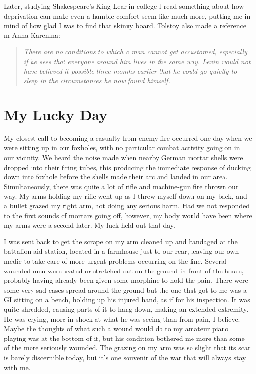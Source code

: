 \documentclass[../m3y]{subfiles}
\begin{document}
Later, studying Shakespeare's King Lear in college I read something about how deprivation can make even a humble comfort seem like much more, putting me in mind of how glad I was to find that skinny board. Tolstoy also made a reference in Anna Karenina:

\begin{quote}
    \emph{There are no conditions to which a man cannot get accustomed, especially if he sees that everyone around him lives in the same way. Levin would not have believed it possible three months earlier that he could go quietly to sleep in the circumstances he now found himself.}
\end{quote}

\section{My Lucky Day}
My closest call to becoming a casualty from enemy fire occurred one day when we were sitting up in our foxholes, with no particular combat activity going on in our vicinity. We heard the noise made when nearby German mortar shells were dropped into their firing tubes, this producing the immediate response of ducking down into foxhole before the shells made their arc and landed in our area. Simultaneously, there was quite a lot of rifle and machine-gun fire thrown our way. My arms holding my rifle went up as I threw myself down on my back, and a bullet grazed my right arm, not doing any serious harm. Had we not responded to the first sounds of mortars going off, however, my body would have been where my arms were a second later. My luck held out that day.

I was sent back to get the scrape on my arm cleaned up and bandaged at the battalion aid station, located in a farmhouse just to our rear, leaving our own medic to take care of more urgent problems occurring on the line. Several wounded men were seated or stretched out on the ground in front of the house, probably having already been given some morphine to hold the pain. There were some very sad cases spread around the ground but the one that got to me was a GI sitting on a bench, holding up his injured hand, as if for his inspection. It was quite shredded, causing parts of it to hang down, making an extended extremity. He was crying, more in shock at what he was seeing than from pain, I believe. Maybe the thoughts of what such a wound would do to my amateur piano playing was at the bottom of it, but his condition bothered me more than some of the more seriously wounded. The grazing on my arm was so slight that its scar is barely discernible today, but it's one souvenir of the war that will always stay with me.
\end{document}
